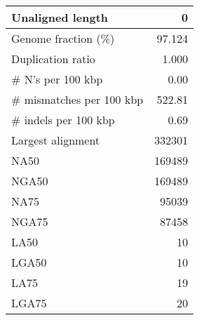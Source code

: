 \documentclass[12pt,a4paper]{article}
\begin{document}
\begin{table}[ht]
\begin{center}
\begin{tabular}{|l*{1}{|r}|}
Unaligned length & 0 \\ \hline
Genome fraction (\%) & 97.124 \\ \hline
Duplication ratio & 1.000 \\ \hline
\# N's per 100 kbp & 0.00 \\ \hline
\# mismatches per 100 kbp & 522.81 \\ \hline
\# indels per 100 kbp & 0.69 \\ \hline
Largest alignment & 332301 \\ \hline
NA50 & 169489 \\ \hline
NGA50 & 169489 \\ \hline
NA75 & 95039 \\ \hline
NGA75 & 87458 \\ \hline
LA50 & 10 \\ \hline
LGA50 & 10 \\ \hline
LA75 & 19 \\ \hline
LGA75 & 20 \\ \hline
\end{tabular}
\end{center}
\end{table}
\end{document}
